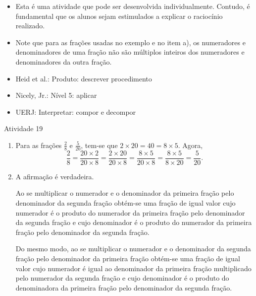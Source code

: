 \begin{multicols}{2}
\begin{itemize} %
    \item       Esta é uma atividade que pode ser desenvolvida individualmente. 
Contudo, é fundamental que os alunos sejam estimulados a explicar o raciocínio 
realizado.
    \item       Note que para as frações usadas no exemplo e no item a), os 
numeradores e denominadores de uma fração não são múltiplos inteiros dos 
numeradores e denominadores da outra fração.
\end{itemize} %
  
  
   \vspace{.1cm}
  
 \vspace{.1cm}
   
\begin{itemize} %
    \item       Heid et al.: Produto: descrever procedimento
    \item       Nicely, Jr.: Nível 5: aplicar
    \item       UERJ: Interpretar: compor e decompor
\end{itemize} %
\clearpage

\begin{resposta*}{Atividade 19}  
\begin{enumerate} [\quad a)] %
    \item       Para as frações       $\frac{2}{8}$       e       
$\frac{5}{20}$, tem-se que        $2 \times 20 = 40 = 8 \times 5$. Agora,       
$$\frac{2}{8} = \frac{20 \times 2}{20 \times 8} = \frac{2 \times 20}{20 \times 
8} = \frac{8 \times 5}{20 \times 8} = \frac{8 \times 5}{8 \times 20} = 
\frac{5}{20}.$$
    \item       A afirmação é verdadeira. 
  
  Ao se multiplicar o numerador e o denominador da primeira fração pelo 
denominador da segunda fração obtém-se uma fração de igual valor cujo numerador 
é o produto do numerador da primeira fração pelo denominador da segunda fração e 
cujo denominador é o produto do numerador da primeira fração pelo denominador da 
segunda fração.   
  
  Do mesmo modo, ao se multiplicar o numerador e o denominador da segunda fração 
pelo denominador da primeira fração obtém-se uma fração de igual valor cujo 
numerador é igual ao denominador da primeira fração multiplicado pelo numerador 
da segunda fração e cujo denominador é o produto do denominadora da primeira 
fração pelo denominador da segunda fração.   
  

\end{enumerate}
\end{resposta*}
\end{multicols}
